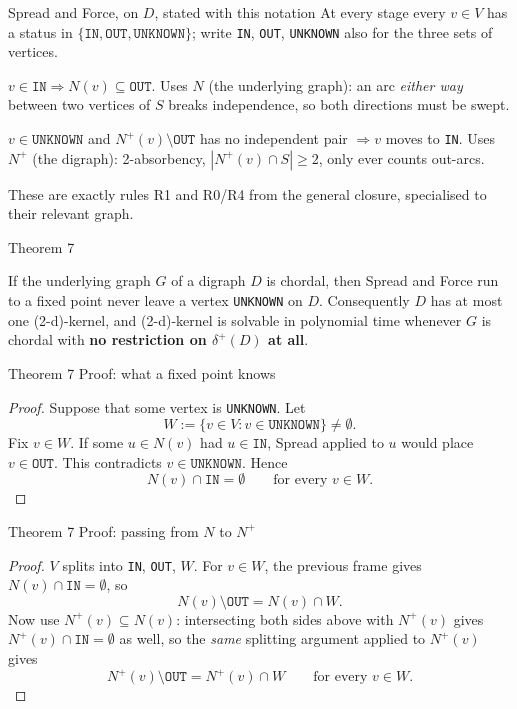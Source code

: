 \documentclass[11pt]{beamer}
\begin{document}
\begin{frame}{Spread and Force, on $D$, stated with this notation}
  At every stage every $v\in V$ has a status in
  $\{\texttt{IN},\texttt{OUT},\texttt{UNKNOWN}\}$; write \texttt{IN},
  \texttt{OUT}, \texttt{UNKNOWN} also for the three sets of vertices.
  \begin{description}[leftmargin=1.8cm,style=nextline]
    \item[Spread] $v\in\texttt{IN} \Rightarrow N(v)\subseteq\texttt{OUT}$.
          Uses $N$ (the underlying graph): an arc \emph{either way} between
          two vertices of $S$ breaks independence, so both directions must
          be swept.
    \item[Force] $v\in\texttt{UNKNOWN}$ and $N^+(v)\setminus\texttt{OUT}$
          has no independent pair $\Rightarrow v$ moves to \texttt{IN}.
          Uses $N^+$ (the digraph): 2-absorbency, $|N^+(v)\cap S|\ge2$,
          only ever counts out-arcs.
  \end{description}
  These are exactly rules R1 and R0/R4 from the general closure, specialised
  to their relevant graph.
\end{frame}

\begin{frame}{Theorem 7}
  \begin{theorem}
    If the underlying graph $G$ of a digraph $D$ is chordal, then Spread and
    Force run to a fixed point never leave a vertex \texttt{UNKNOWN} on $D$.
    Consequently $D$ has at most one (2-d)-kernel, and (2-d)-kernel is
    solvable in polynomial time whenever $G$ is chordal
    with \textbf{no restriction on $\delta^+(D)$ at all}.
  \end{theorem}
\end{frame}

\begin{frame}{Theorem 7 Proof: what a fixed point knows}
  \begin{proof}
    Suppose that some vertex is \texttt{UNKNOWN}. Let
    \[
      W := \{v\in V : v \in \texttt{UNKNOWN}\} \neq \emptyset.
    \]
    Fix $v\in W$. If some $u\in N(v)$ had $u\in\texttt{IN}$, Spread applied to $u$ would
    place $v\in\texttt{OUT}$. This contradicts $v\in\texttt{UNKNOWN}$. Hence
    \[
      N(v)\cap\texttt{IN}=\emptyset
      \qquad\text{for every } v\in W.
    \]
  \end{proof}
\end{frame}

\begin{frame}{Theorem 7 Proof: passing from $N$ to $N^+$}
  \begin{proof}
    $V$ splits into \texttt{IN}, \texttt{OUT}, $W$. For $v\in W$, the
    previous frame gives $N(v)\cap\texttt{IN}=\emptyset$, so
    \[
      N(v)\setminus\texttt{OUT} = N(v)\cap W.
    \]
    Now use $N^+(v)\subseteq N(v)$: intersecting both sides above with
    $N^+(v)$ gives $N^+(v)\cap\texttt{IN}=\emptyset$ as well, so the
    \emph{same} splitting argument applied to $N^+(v)$ gives
    \[
      \boxed{N^+(v)\setminus\texttt{OUT} = N^+(v)\cap W
        \qquad\text{for every } v\in W.}
    \]
  \end{proof}
\end{frame}
\end{document}
